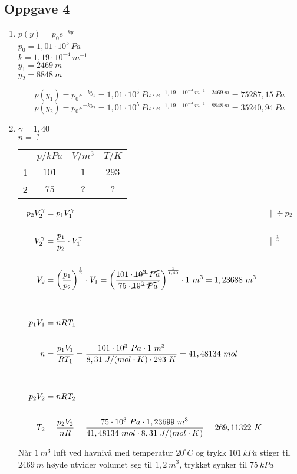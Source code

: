 \documentclass{report}%
\newcommand{\opg}[1]{\subsection*{Oppgave #1}}
\newcommand{\opgd}[1]{\item}
\begin{document}
\newpage
\opg{4}
\begin{enumerate}[leftmargin=*,itemsep=1cm,labelsep=2em,label=\alph*)]
\opgd{a}
$p(y) = p_0 e^{-ky}$\\
$p_0 = 1,01 \cdot 10^5\ Pa$\\
$k = 1,19 \cdot 10^{-4}\ m^{-1}$\\
$y_1 = 2469\ m$\\
$y_2 = 8848\ m$

$$p(y_1) = p_0 e^{-k y_1} = 1,01 \cdot 10^5\ Pa \cdot e^{-1,19\ \cdot\ 10^{-4}\ m^{-1}\ \cdot\ 2469\ m} = 75287,15\ Pa$$
$$p(y_2) = p_0 e^{-k y_2} = 1,01 \cdot 10^5\ Pa \cdot e^{-1,19\ \cdot\ 10^{-4}\ m^{-1}\ \cdot\ 8848\ m} = 35240,94\ Pa$$


\opgd{b}

$\gamma = 1,40$\\
$n =\ ?$\\

\begin{tabular}{ c|c|c|c }
  & $p/kPa$ & $V/m^3$ & $T/K$  \\
1 & $101$   & $1$     & $293$ \\
2 & $75$    & $?$     & $?$    \\
\end{tabular}

\vspace{0.2cm}

\begin{align*}
p_2 V_2^{\gamma} &= p_1 V_1^{\gamma} &&|\ \div p_2\\\\
V_2^{\gamma} &= \frac{p_1}{p_2} \cdot V_1^{\gamma} &&|\ ^{\frac{1}{\gamma}}\\\\
V_2 &= \left( \frac{p_1}{p_2} \right) ^{\frac{1}{\gamma}} \cdot V_1 = \left( \frac{101 \cdot \cancel{10^3\ Pa}}{75 \cdot \cancel{10^3\ Pa}} \right)^{\frac{1}{1,40}} \cdot 1\ m^3 = 1,23688\ m^3\\\\\\
p_1 V_1 &= nRT_1\\\\
n &= \frac{p_1 V_1}{R T_1} = \frac{101 \cdot 10^3\ Pa \cdot 1\ m^3}{8,31\ J/(mol \cdot K) \cdot 293\ K} = 41,48134\ mol\\\\\\
p_2 V_2 &= nRT_2\\\\
T_2 &= \frac{p_2 V_2}{nR} = \frac{75 \cdot 10^3\ Pa \cdot 1,23699\ m^3}{41,48134\ mol \cdot 8,31\ J/(mol \cdot K)} = 269,11322\ K
\end{align*}

Når $1\ m^3$ luft ved havnivå med temperatur $20^\circ C$ og trykk $101\ kPa$ stiger til $2469\ m$ høyde utvider volumet seg til $1,2\ m^3$, trykket synker til $75\ kPa$ 

\end{enumerate}
\end{document}
